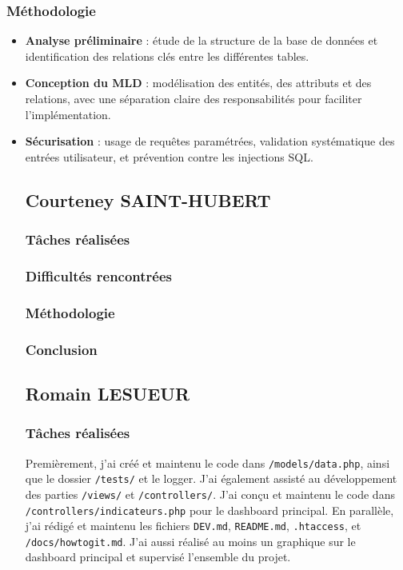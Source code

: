 \documentclass[11pt]{article}
\begin{document}
\subsubsection*{Méthodologie}
\begin{itemize}
    \item \textbf{Analyse préliminaire} : étude de la structure de la base de données et identification des relations clés entre les différentes tables.
    \item \textbf{Conception du MLD} : modélisation des entités, des attributs et des relations, avec une séparation claire des responsabilités pour faciliter l’implémentation.
    \item \textbf{Sécurisation} : usage de requêtes paramétrées, validation systématique des entrées utilisateur, et prévention contre les injections SQL.

\subsection*{Courteney SAINT-HUBERT}
\subsubsection*{Tâches réalisées}
\subsubsection*{Difficultés rencontrées}
\subsubsection*{Méthodologie}
\subsubsection*{Conclusion}

\newpage
\subsection*{Romain LESUEUR}
\subsubsection*{Tâches réalisées}
Premièrement, j’ai créé et maintenu le code dans \texttt{/models/data.php}, ainsi que le dossier \texttt{/tests/} et le logger. J’ai également assisté au développement des parties \texttt{/views/} et \texttt{/controllers/}. J’ai conçu et maintenu le code dans \texttt{/controllers/indicateurs.php} pour le dashboard principal. En parallèle, j’ai rédigé et maintenu les fichiers \texttt{DEV.md}, \texttt{README.md}, \texttt{.htaccess}, et \texttt{/docs/howtogit.md}. J’ai aussi réalisé au moins un graphique sur le dashboard principal et supervisé l’ensemble du projet.


\end{itemize}
\end{document}
